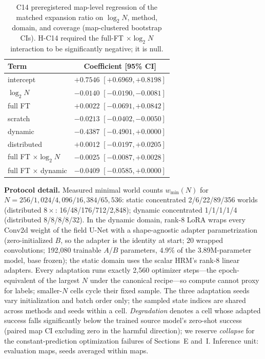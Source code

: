 \documentclass[letterpaper]{article} %
\newcommand{\stage}[1]{\textsc{#1}}
\begin{document}
\begin{table}[t]
\centering
\small
\setlength{\tabcolsep}{3pt}
\begin{tabular}{@{}lc@{}}
\toprule
Term & Coefficient [95\% CI] \\
\midrule
intercept & $+0.7546$ $[+0.6969, +0.8198]$ \\
$\log_2 N$ & $-0.0140$ $[-0.0190, -0.0081]$ \\
full FT & $+0.0022$ $[-0.0691, +0.0842]$ \\
scratch & $-0.0213$ $[-0.0402, -0.0050]$ \\
dynamic & $-0.4387$ $[-0.4901, +0.0000]$ \\
distributed & $+0.0012$ $[-0.0197, +0.0205]$ \\
full FT $\times \log_2 N$ & $-0.0025$ $[-0.0087, +0.0028]$ \\
full FT $\times$ dynamic & $-0.0409$ $[-0.0585, +0.0000]$ \\
\bottomrule
\end{tabular}
\caption{\stage{C14} preregistered map-level regression of the matched expansion ratio on $\log_2 N$, method, domain, and coverage (map-clustered bootstrap CIs). H-C14 required the full-FT $\times \log_2 N$ interaction to be significantly negative; it is null.}
\label{tab:c14reg}
\end{table}

\textbf{Protocol detail.} Measured minimal world counts $w_{\min}(N)$ for $N{=}256/1{,}024/4{,}096/16{,}384/65{,}536$: static concentrated 2/6/22/89/356 worlds (distributed $8\times$: 16/48/176/712/2{,}848); dynamic concentrated 1/1/1/1/4 (distributed 8/8/8/8/32). In the dynamic domain, rank-8 LoRA wraps every Conv2d weight of the field U-Net with a shape-agnostic adapter parametrization (zero-initialized $B$, so the adapter is the identity at start; 20 wrapped convolutions; 192{,}080 trainable $A$/$B$ parameters, 4.9\% of the 3.89M-parameter model, base frozen); the static domain uses the scalar HRM's rank-8 linear adapters. Every adaptation runs exactly 2{,}560 optimizer steps---the epoch-equivalent of the largest $N$ under the canonical recipe---so compute cannot proxy for labels; smaller-$N$ cells cycle their fixed sample. The three adaptation seeds vary initialization and batch order only; the sampled state indices are shared across methods and seeds within a cell. \emph{Degradation} denotes a cell whose adapted success falls significantly below the trained source model's zero-shot success (paired map CI excluding zero in the harmful direction); we reserve \emph{collapse} for the constant-prediction optimization failures of Sections~E and~I. Inference unit: evaluation maps, seeds averaged within maps.
\end{document}

